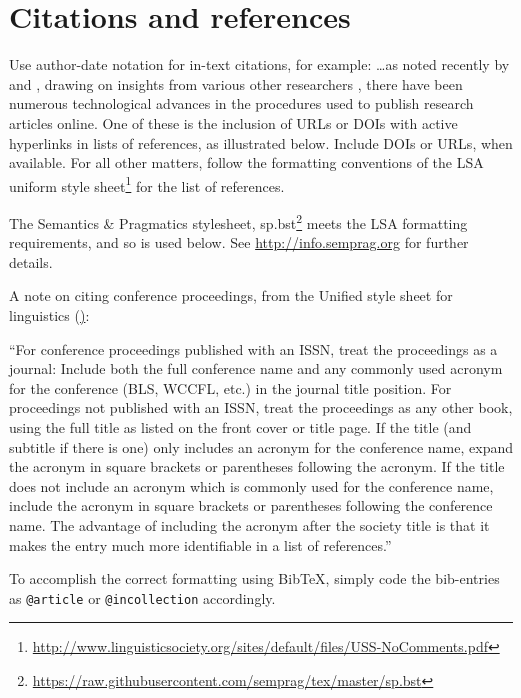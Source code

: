 \documentclass[12pt,letterpaper]{article}
\begin{document}
\section{Citations and references} \label{s:cite} Use author-date notation for in-text citations, for example: \ldots as noted recently by \citet{Silk2012} and \citet{AnderBois2014} , drawing on insights from various other researchers \cite[e.g.][]{Chomsky1986,Yu2003,Christiansenetal2016}, there have been numerous technological advances in the procedures used to publish research articles online. One of these is the inclusion of URLs or DOIs with active hyperlinks in lists of references, as illustrated below. Include DOIs or URLs, when available. For all other matters, follow the formatting conventions of the LSA uniform style sheet\footnote{\url{http://www.linguisticsociety.org/sites/default/files/USS-NoComments.pdf}} for the list of references. 

The Semantics \& Pragmatics stylesheet, sp.bst\footnote{ \url{https://raw.githubusercontent.com/semprag/tex/master/sp.bst}} meets the LSA formatting requirements, and so is used below. See \url{http://info.semprag.org} for further details. 

A note on citing conference proceedings, from the Unified style sheet for linguistics (\href{https://www.linguisticsociety.org/sites/default/files/style-sheet_0.pdf}):

\begin{quoting}
    ``For conference proceedings
published with an ISSN, treat the proceedings as a journal: Include both the full
conference name and any commonly used acronym for the conference (BLS, WCCFL,
etc.) in the journal title position. For proceedings not published with an ISSN, treat the
proceedings as any other book, using the full title as listed on the front cover or title
page. If the title (and subtitle if there is one) only includes an acronym for the
conference name, expand the acronym in square brackets or parentheses following the
acronym. If the title does not include an acronym which is commonly used for the
conference name, include the acronym in square brackets or parentheses following the
conference name. The advantage of including the acronym after the society title is that it
makes the entry much more identifiable in a list of references.''

\end{quoting}

\noindent To accomplish the correct formatting using BibTeX, simply code the bib-entries as \verb=@article= or \verb=@incollection= accordingly.
 
\end{document}
